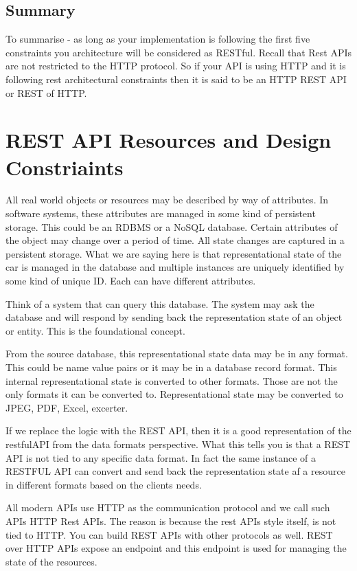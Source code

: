 \subsection{Summary}
To summarise - as long as your implementation is following the first five constraints you architecture will be considered as RESTful.
Recall that Rest APIs are not restricted to the HTTP protocol.
So if your API is using HTTP and it is following rest architectural constraints then it is said to be an HTTP REST API or REST of HTTP.


\section{REST API Resources and Design Constriaints}
All real world objects or resources may be described by way of attributes.
In software systems, these attributes are managed in some kind of persistent storage.
This could be an RDBMS or a NoSQL database.
Certain attributes of the object may change over a period of time.
All state changes are captured in a persistent storage.
What we are saying here is that representational state of the car is managed in the database and multiple instances are uniquely identified by some kind of unique ID.
Each can have different attributes.

Think of a system that can query this database.
The system may ask the database and will respond by sending back the representation state of an object or entity.
This is the foundational concept.

From the source database, this representational state data may be in any format.
This could be name value pairs or it may be in a database record format.
This internal representational state is converted to other formats.
Those are not the only formats it can be converted to.
Representational state may be converted to JPEG, PDF, Excel, excerter.

If we replace the logic with the REST API, then it is a good representation of the restfulAPI from the data formats perspective.
What this tells you is that a REST API is not tied to any specific data format.
In fact the same instance of a RESTFUL API can convert and send back the representation state af a resource in different formats based on the clients needs.

All modern APIs use HTTP as the communication protocol and we call such APIs HTTP Rest APIs.
The reason is because the rest APIs style itself, is not tied to HTTP.
You can build REST APIs with other protocols as well.
REST over HTTP APIs expose an endpoint and this endpoint is used for managing the state of the resources.


